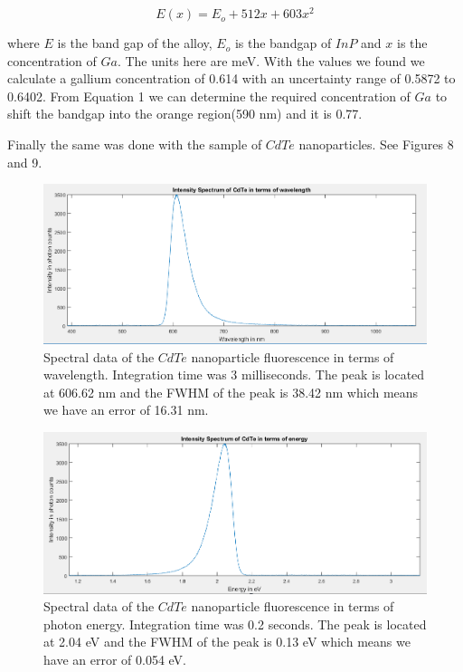 \documentclass{article}
\begin{document}
\begin{equation}
    E(x)=E_o + 512x + 603x^2
\end{equation}

where $E$ is the band gap of the alloy, $E_o$ is the bandgap of $InP$ and $x$ is the concentration of $Ga$.  The units here are meV.  With the values we found we calculate a gallium concentration of 0.614 with an uncertainty range of 0.5872 to 0.6402.  From Equation 1 we can determine the required concentration of $Ga$ to shift the bandgap into the orange region(590 nm) and it is 0.77. 

Finally the same was done with the sample of $CdTe$ nanoparticles.  See Figures 8 and 9.

\begin{figure}[H]
\includegraphics[scale=.65,center]{cdtenm.PNG}
\caption{Spectral data of the $CdTe$ nanoparticle fluorescence in terms of wavelength.  Integration time was 3 milliseconds.  The peak is located at 606.62 nm and the FWHM of the peak is 38.42 nm which means we have an error of 16.31 nm.}
\end{figure}

\begin{figure}[H]
\includegraphics[scale=.65,center]{cdteev.PNG}
\caption{Spectral data of the $CdTe$ nanoparticle fluorescence in terms of photon energy.  Integration time was 0.2 seconds.  The peak is located at 2.04 eV and the FWHM of the peak is 0.13 eV which means we have an error of 0.054 eV.}
\end{figure}
\end{document}
